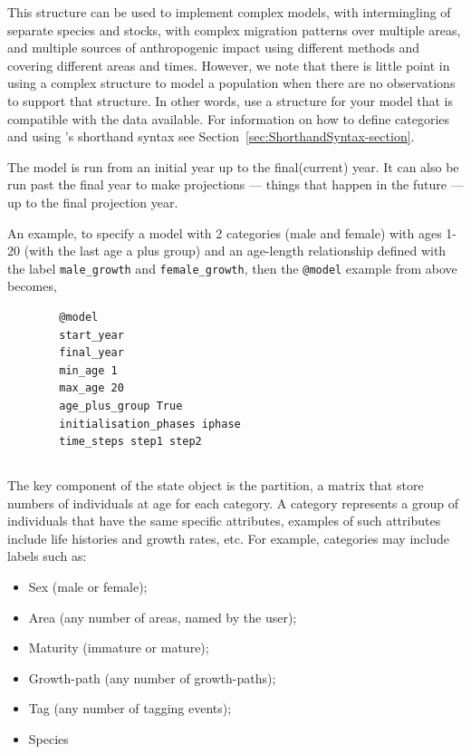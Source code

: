 This structure can be used to implement complex models, with intermingling of separate species and stocks, with complex migration patterns over multiple areas, and multiple sources of anthropogenic impact using different methods and covering different areas and times. However, we note that there is little point in using a complex structure to model a population when there are no observations to support that structure. In other words, use a structure for your model that is compatible with the data available. For information on how to define categories and using \CNAME's shorthand syntax see Section~\ref{sec:ShorthandSyntax-section}.

The model is run from an initial year up to the final(current) year. It can also be run past the final year to make projections --- things that happen in the future --- up to the final projection year.

An example, to specify a model with 2 categories (male and female) with ages 1-20 (with the last age a plus group) and an age-length relationship defined with the label \texttt{male\_growth} and \texttt{female\_growth}, then the \texttt{@model} example from above becomes,
{\small{\begin{verbatim}
		@model
		start_year
		final_year
		min_age 1
		max_age 20
		age_plus_group True
		initialisation_phases iphase
		time_steps step1 step2
\end{verbatim}}}

\subsection{}

The key component of the state object is the partition, a matrix that store numbers of individuals at age for each category. A category represents a group of individuals that have the same specific attributes, examples of such attributes include life histories and growth rates, etc. For example, categories may include labels such as:

\begin{itemize}
\item Sex (male or female);
\item Area (any number of areas, named by the user);
\item Maturity (immature or mature);
\item Growth-path (any number of growth-paths);
\item Tag (any number of tagging events);
\item Species
\end{itemize}

